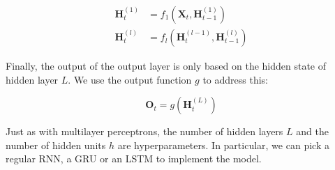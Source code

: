 $$\begin{aligned}
\mathbf{H}_t^{(1)} & = f_1\left(\mathbf{X}_t, \mathbf{H}_{t-1}^{(1)}\right) \\
\mathbf{H}_t^{(l)} & = f_l\left(\mathbf{H}_t^{(l-1)}, \mathbf{H}_{t-1}^{(l)}\right)
\end{aligned}$$

Finally, the output of the output layer is only based on the hidden state of hidden layer $L$. We use the output function $g$ to address this:

$$\mathbf{O}_t = g \left(\mathbf{H}_t^{(L)}\right)$$

Just as with multilayer perceptrons, the number of hidden layers $L$ and the number of hidden units $h$ are hyperparameters. In particular, we can pick a regular RNN, a GRU or an LSTM to implement the model.






